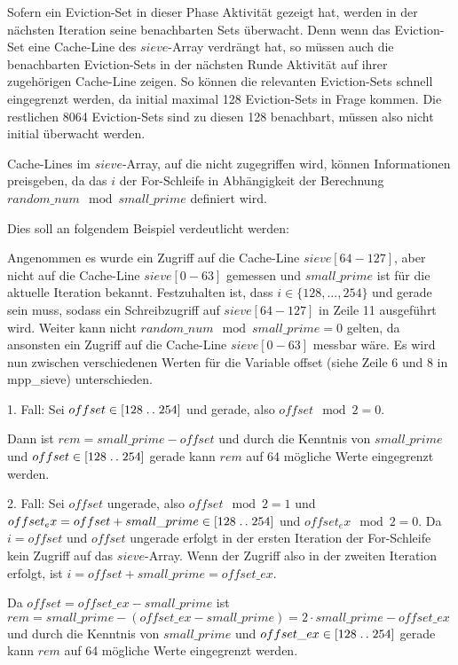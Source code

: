 Sofern ein Eviction-Set in dieser Phase Aktivität gezeigt hat, werden in der nächsten Iteration seine benachbarten Sets überwacht.
Denn wenn das Eviction-Set eine Cache-Line des $sieve$-Array verdrängt hat, so müssen auch die benachbarten Eviction-Sets in der nächsten Runde Aktivität auf ihrer zugehörigen Cache-Line zeigen.
So können die relevanten Eviction-Sets schnell eingegrenzt werden, da initial maximal 128 Eviction-Sets in Frage kommen.
Die restlichen 8064 Eviction-Sets sind zu diesen 128 benachbart, müssen also nicht initial überwacht werden.

Cache-Lines im $sieve$-Array, auf die nicht zugegriffen wird, können Informationen preisgeben, da das $i$ der For-Schleife in Abhängigkeit der Berechnung $random\_num \mod small\_prime$ definiert wird.

Dies soll an folgendem Beispiel verdeutlicht werden:

Angenommen es wurde ein Zugriff auf die Cache-Line $sieve[64-127]$, aber nicht auf die Cache-Line $sieve[0-63]$ gemessen und $small\_prime$ ist für die aktuelle Iteration bekannt. Festzuhalten ist, dass $i \in \{128,...,254\}$ und gerade sein muss, sodass ein Schreibzugriff auf $sieve[64-127]$ in Zeile 11 ausgeführt wird.
Weiter kann nicht $random\_num \mod small\_prime = 0$ gelten, da ansonsten ein Zugriff auf die Cache-Line $sieve[0-63]$ messbar wäre. 
Es wird nun zwischen verschiedenen Werten für die Variable offset (siehe Zeile 6 und 8 in mpp_sieve) unterschieden.

1. Fall: Sei $offset \in [128\mathrel{{.}\,{.}}\nobreak254]$ und gerade, also $offset \mod 2 = 0$. 

Dann ist $rem = small\_prime - offset$ und durch die Kenntnis von $small\_prime$ und $offset \in [128\mathrel{{.}\,{.}}\nobreak254]$ gerade kann $rem$ auf 64 mögliche Werte eingegrenzt werden.

2. Fall: Sei $offset$ ungerade, also $offset \mod 2 = 1$ und $offset_ex = offset + small\_prime \in [128\mathrel{{.}\,{.}}\nobreak254]$ und $offset_ex \mod 2 = 0$. Da $i=offset$ und $offset$ ungerade erfolgt in der ersten Iteration der For-Schleife kein Zugriff auf das $sieve$-Array. Wenn der Zugriff also in der zweiten Iteration erfolgt, ist $i = offset + small\_prime = offset\_ex$.

Da $offset = offset\_ex - small\_prime$ ist $rem = small\_prime - (offset\_ex - small\_prime) = 2 \cdot small\_prime - offset\_ex$ und durch die Kenntnis von $small\_prime$ und $offset\_ex \in [128\mathrel{{.}\,{.}}\nobreak254]$ gerade kann $rem$ auf 64 mögliche Werte eingegrenzt werden.

